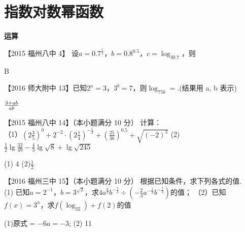 \section{指数对数幂函数}
  \begin{exercise}{\large \bf 运\hspace{0.6em}算}
    \item
      【2015 福州八中 4】 设$a=0.7^{\frac12} $，$b=0.8^{0.5} $，$c=\log_30.7$，则\xz
      \begin{answer}
        B
      \end{answer}
    \item
      【2016 师大附中 13】已知$2^a=3 $，$3^b=7$，则$\log_756= $\tk.(结果用 a, b 表示)
      \begin{answer}
        $3+ab\over ab$
      \end{answer}
    \item
      【2015 福州八中 14】（本小题满分 10 分）
      计算：\\
      （1）$\displaystyle (2\frac{3}{5})^0+2^{-2}\cdot(2\frac14)^{-\frac12}+(\frac{25}{36})^{0.5}+\sqrt{(-2)^2} $
      \hspace{5em}
      (2)$\displaystyle \frac12 \lg{\frac{32}{49}}-\frac43\lg{\sqrt 8}+\lg{\sqrt {245}} $
      \begin{answer}
        (1) 4 (2)$\frac12$
      \end{answer}
    \vspace{12em}
    \item
      【2016 福州三中 15】（本小题满分 10 分） 根据已知条件，求下列各式的值.\\
      (1) 已知$a=2^{-1}$，$b=3^{\sqrt2}$，求$4a^{\frac23}b^{-\frac13}\div(-\frac23a^{-\frac13}b^{-\frac13})$的值；
      （2）已知$f(x)=3^x$，求$f(\log_32)+f(2)$的值
      \begin{answer}
        (1)原式 = $-6a=-3$;
        (2) 11
      \end{answer}
    \vspace{9em}
  \end{exercise}
